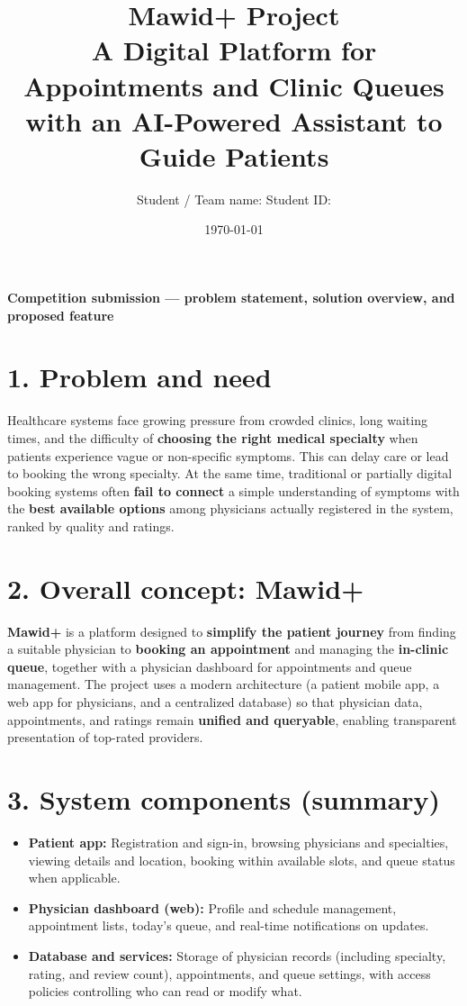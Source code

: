 \documentclass[12pt,a4paper]{article}
\title{\textbf{Mawid+ Project\\A Digital Platform for Appointments and Clinic Queues\\with an AI-Powered Assistant to Guide Patients}}
\author{Student / Team name: \underline{\hspace{6cm}} \quad Student ID: \underline{\hspace{3cm}}}
\date{\today}
\begin{document}
\maketitle
\vspace{-0.5em}
\begin{center}\small
\textbf{Competition submission --- problem statement, solution overview, and proposed feature}
\end{center}
\vspace{0.6em}

\section*{1. Problem and need}
Healthcare systems face growing pressure from crowded clinics, long waiting times, and the difficulty of \textbf{choosing the right medical specialty} when patients experience vague or non-specific symptoms. This can delay care or lead to booking the wrong specialty. At the same time, traditional or partially digital booking systems often \textbf{fail to connect} a simple understanding of symptoms with the \textbf{best available options} among physicians actually registered in the system, ranked by quality and ratings.

\section*{2. Overall concept: Mawid+}
\textbf{Mawid+} is a platform designed to \textbf{simplify the patient journey} from finding a suitable physician to \textbf{booking an appointment} and managing the \textbf{in-clinic queue}, together with a physician dashboard for appointments and queue management. The project uses a modern architecture (a patient mobile app, a web app for physicians, and a centralized database) so that physician data, appointments, and ratings remain \textbf{unified and queryable}, enabling transparent presentation of top-rated providers.

\section*{3. System components (summary)}
\begin{itemize}
  \item \textbf{Patient app:} Registration and sign-in, browsing physicians and specialties, viewing details and location, booking within available slots, and queue status when applicable.
  \item \textbf{Physician dashboard (web):} Profile and schedule management, appointment lists, today's queue, and real-time notifications on updates.
  \item \textbf{Database and services:} Storage of physician records (including specialty, rating, and review count), appointments, and queue settings, with access policies controlling who can read or modify what.
\end{itemize}
\end{document}
